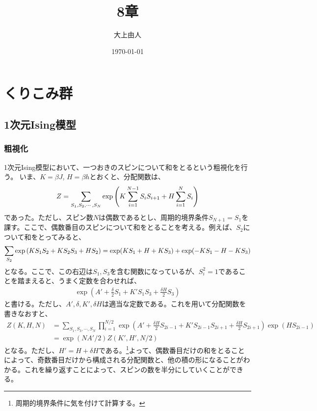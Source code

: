 \documentclass[a4paper,11pt]{jsarticle}
\numberwithin{equation}{section}
\begin{document}
\title{8章}
\author{大上由人}
\date{\today}
\maketitle

\setcounter{section}{7}
\section{くりこみ群}
\subsection{1次元Ising模型}
\subsubsection{粗視化}
1次元Ising模型において、一つおきのスピンについて和をとるという粗視化を行う。
いま、$K = \beta J$, $H = \beta h$とおくと、分配関数は、
\begin{align}
    Z = \sum_{S_1, S_2, \cdots, S_N} \exp \qty(K \sum_{i=1}^{N-1} S_i S_{i+1} + H \sum_{i=1}^{N} S_i)
\end{align}
であった。ただし、スピン数$N$は偶数であるとし、周期的境界条件$S_{N+1} = S_1$を課す。ここで、偶数番目のスピンについて和をとることを考える。例えば、$S_2$について和をとってみると、
\begin{align}
    \sum_{S_2} \exp \qty(K S_1 S_2 + K S_2 S_3 + H S_2) = \exp(K S_1 + H + K S_3) + \exp(-K S_1 - H - K S_3)
\end{align}
となる。ここで、この右辺は$S_1, S_3$を含む関数になっているが、$S_i^2 = 1$であることを踏まえると、うまく定数を合わせれば、
\begin{align}
    \exp(A' + \frac{\delta}{2} S_1 + K'S_1 S_3 + \frac{\delta H}{2} S_3) 
\end{align}
と書ける。ただし、$A', \delta, K', \delta H$は適当な定数である。これを用いて分配関数を書きなおすと、
\begin{align}
    Z(K,H,N) &= \sum_{S_1, S_3, \cdots, S_N}  \prod_{i=1}^{N/2} \exp(A' + \frac{\delta H}{2} S_{2i-1} + K' S_{2i-1} S_{2i+1} + \frac{\delta H}{2} S_{2i+1}) \exp(HS_{2i-1}) \\
    &= \exp(NA'/2) Z(K', H', N/2)
\end{align}
となる。ただし、$H' = H + \delta H$である。\footnote{周期的境界条件に気を付けて計算する。}よって、偶数番目だけの和をとることによって、奇数番目だけから構成される分配関数と、他の積の形になることがわかる。これを繰り返すことによって、スピンの数を半分にしていくことができる。
\end{document}
